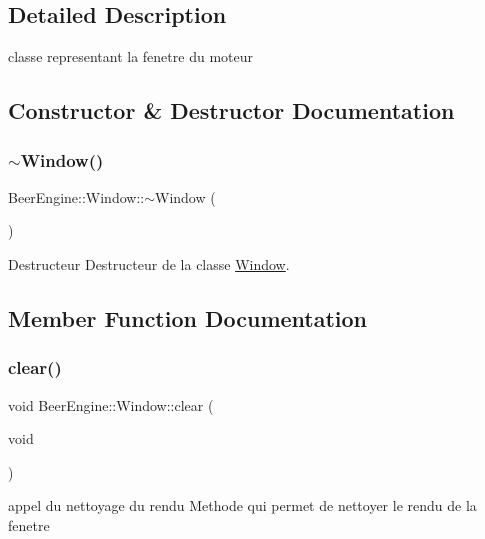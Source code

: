 \subsection{Detailed Description}
classe representant la fenetre du moteur 

\subsection{Constructor \& Destructor Documentation}
\mbox{\label{class_beer_engine_1_1_window_a3ae0fe522cf721377047b1027d591d33}} 
\subsubsection{\texorpdfstring{$\sim$\+Window()}{~Window()}}
{\footnotesize\ttfamily Beer\+Engine\+::\+Window\+::$\sim$\+Window (\begin{DoxyParamCaption}{ }\end{DoxyParamCaption})}



Destructeur Destructeur de la classe \mbox{\hyperlink{class_beer_engine_1_1_window}{Window}}. 



\subsection{Member Function Documentation}
\mbox{\label{class_beer_engine_1_1_window_a7417b4c023c22a9641a1b94cd0cfee93}} 
\subsubsection{\texorpdfstring{clear()}{clear()}}
{\footnotesize\ttfamily void Beer\+Engine\+::\+Window\+::clear (\begin{DoxyParamCaption}\item[{void}]{ }\end{DoxyParamCaption})}



appel du nettoyage du rendu Methode qui permet de nettoyer le rendu de la fenetre 

